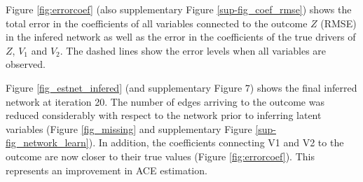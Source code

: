 \documentclass{article}
\begin{document}
Figure \ref{fig:errorcoef} (also supplementary Figure \ref{sup-fig_coef_rmse}) shows the total error in the coefficients
of all variables connected to the outcome $Z$ (RMSE) in the infered network as
well as the error in the coefficients of the true drivers of $Z$, $V_1$
and $V_2$. The dashed lines show the error levels when all variables are observed.


Figure \ref{fig_estnet_infered}  (and supplementary Figure 7) shows the final inferred network at iteration 20. The number of edges arriving to the outcome was reduced considerably with respect to the network prior to inferring latent variables (Figure \ref{fig_missing} and supplementary Figure \ref{sup-fig_network_learn}). In addition, the coefficients connecting V1 and V2 to the outcome are now closer to their true values (Figure \ref{fig:errorcoef}). This represents an improvement in ACE estimation.
\end{document}
